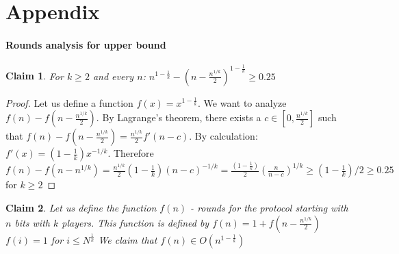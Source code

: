 \documentclass{article}
\theoremstyle{plain}
\newtheorem{claim}{Claim}
\begin{document}
\section{Appendix}
\paragraph{Rounds analysis for upper bound}
\begin{claim}
    For $k \geq 2$ and every $n$: $n^{1 - \frac{1}{k}} - (n-\frac{n^{1/k}}{2})^{1-\frac{1}{k}} \geq 0.25$
\end{claim}
\begin{proof}
    Let us define a function $f(x) = x^{1-\frac{1}{k}}$. We want to analyze $f(n) - f(n-\frac{n^{1/k}}{2})$. By Lagrange's theorem, there exists a $c \in [0, \frac{n^{1/k}}{2}]$ such that $f(n) - f(n-\frac{n^{1/k}}{2}) = \frac{n^{1/k}}{2} f'(n-c)$. By calculation: $f'(x) = (1-\frac{1}{k})x^{-1/k}$. Therefore $f(n) -  f(n-n^{1/k}) = \frac{n^{1/k}}{2} (1-\frac{1}{k}) (n-c)^{-1/k} = \frac{(1-\frac{1}{k})}{2} (\frac{n}{n-c})^{1/k} \geq (1-\frac{1}{k})/2 \geq 0.25$ for $k \geq 2$ 
\end{proof}
\begin{claim}
    Let us define the function $f(n)$ - rounds for the protocol starting with $n$ bits with $k$ players. This function is defined by $f(n) = 1 + f(n - \frac{n^{1/k}}{2})$ \newline
    $f(i) = 1$ for $i \leq N^{\frac{1}{k}}$ \newline
    We claim that $f(n) \in O(n^{1-\frac{1}{k}})$
\end{claim}
\end{document}
